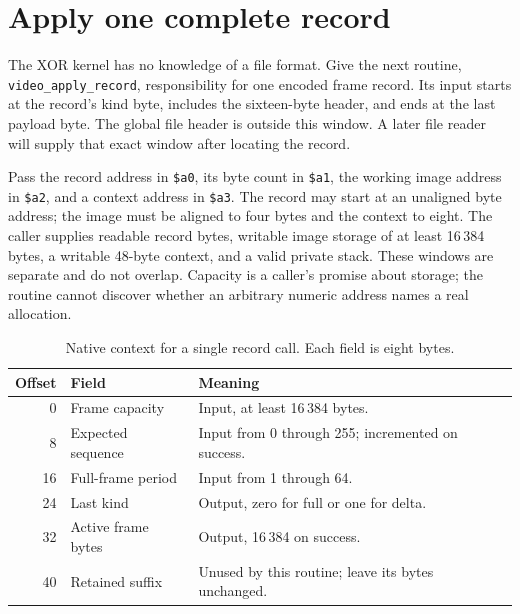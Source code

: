 \section{Apply one complete record}
The XOR kernel has no knowledge of a file format. Give the next routine,
\texttt{video\_apply\_record}, responsibility for one encoded frame record. Its input
starts at the record's kind byte, includes the sixteen-byte header, and ends at the
last payload byte. The global file header is outside this window. A later file
reader will supply that exact window after locating the record.

Pass the record address in \texttt{\$a0}, its byte count in \texttt{\$a1}, the working
image address in \texttt{\$a2}, and a context address in \texttt{\$a3}. The record
may start at an unaligned byte address; the image must be aligned to four bytes and
the context to eight. The caller supplies readable record bytes, writable image
storage of at least 16\,384 bytes, a writable 48-byte context, and a valid private
stack. These windows are separate and do not overlap. Capacity is a caller's
promise about storage; the routine cannot discover whether an arbitrary numeric
address names a real allocation.

\begin{table}[htbp]
  \centering
  \caption{Native context for a single record call. Each field is eight bytes.}
  \label{tab:video-record-context}
  \begin{tabular}{r p{1.4in} p{2.9in}}
    \toprule
    Offset & Field              & Meaning                                            \\
    \midrule
    0      & Frame capacity     & Input, at least 16\,384 bytes.                     \\
    8      & Expected sequence  & Input from 0 through 255; incremented on success.  \\
    16     & Full-frame period  & Input from 1 through 64.                           \\
    24     & Last kind          & Output, zero for full or one for delta.            \\
    32     & Active frame bytes & Output, 16\,384 on success.                        \\
    40     & Retained suffix    & Unused by this routine; leave its bytes unchanged. \\
    \bottomrule
  \end{tabular}
\end{table}


